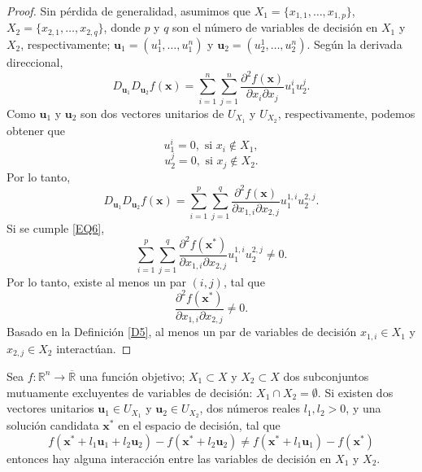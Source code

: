 \begin{proof}
Sin pérdida de generalidad, asumimos que \( X_1 = \{x_{1,1}, \ldots, x_{1,p}\} \), \( X_2 = \{x_{2,1}, \ldots, x_{2,q}\} \), donde \( p \) y \( q \) son el número de variables de decisión en \( X_1 \) y \( X_2 \), respectivamente; \( \mathbf{u}_1 = (u_1^1, \ldots, u_1^n) \) y \( \mathbf{u}_2 = (u_2^1, \ldots, u_2^n) \). Según la derivada direccional,
\begin{equation}
D_{\mathbf{u}_1} D_{\mathbf{u}_2} f(\mathbf{x}) = \sum_{i=1}^{n} \sum_{j=1}^{n} \frac{\partial^2 f(\mathbf{x})}{\partial x_i \partial x_j} u_1^i u_2^j.
\label{EQ17}
\end{equation}
Como \( \mathbf{u}_1 \) y \( \mathbf{u}_2 \) son dos vectores unitarios de \( U_{X_1} \) y \( U_{X_2} \), respectivamente, podemos obtener que
\begin{equation}
u_1^i = 0, \text{ si } x_i \notin X_1,
\label{EQ18}
\end{equation}
\begin{equation}
u_2^j = 0, \text{ si } x_j \notin X_2.
\label{EQ19}
\end{equation}
Por lo tanto,
\begin{equation}
D_{\mathbf{u}_1} D_{\mathbf{u}_2} f(\mathbf{x}) = \sum_{i=1}^{p} \sum_{j=1}^{q} \frac{\partial^2 f(\mathbf{x})}{\partial x_{1,i} \partial x_{2,j}} u_1^{1,i} u_2^{2,j}.
\label{EQ20}
\end{equation}
Si se cumple \eqref{EQ6},
\begin{equation}
\sum_{i=1}^{p} \sum_{j=1}^{q} \frac{\partial^2 f(\mathbf{x}^*)}{\partial x_{1,i} \partial x_{2,j}} u_1^{1,i} u_2^{2,j} \neq 0.
\label{EQ21}
\end{equation}
Por lo tanto, existe al menos un par \((i, j)\), tal que
\begin{equation}
\frac{\partial^2 f(\mathbf{x}^*)}{\partial x_{1,i} \partial x_{2,j}} \neq 0.
\label{EQ22}
\end{equation}
Basado en la Definición \ref{D5}, al menos un par de variables de decisión \( x_{1,i} \in X_1 \) y \( x_{2,j} \in X_2 \) interactúan.
\end{proof}

\begin{corolario}
\label{C1}
Sea \( f : \mathbb{R}^n \to \overline{\mathbb{R}} \) una función objetivo; \( X_1 \subset X \) y \( X_2 \subset X \) dos subconjuntos mutuamente excluyentes de variables de decisión: \( X_1 \cap X_2 = \emptyset \). Si existen dos vectores unitarios \( \mathbf{u}_1 \in U_{X_1} \) y \( \mathbf{u}_2 \in U_{X_2} \), dos números reales \( l_1, l_2 > 0 \), y una solución candidata \( \mathbf{x}^* \) en el espacio de decisión, tal que
\begin{equation}
f(\mathbf{x}^* + l_1 \mathbf{u}_1 + l_2 \mathbf{u}_2) - f(\mathbf{x}^* + l_2 \mathbf{u}_2) \neq f(\mathbf{x}^* + l_1 \mathbf{u}_1) - f(\mathbf{x}^*)
\label{EQ23}
\end{equation}
entonces hay alguna interacción entre las variables de decisión en \( X_1 \) y \( X_2 \).
\end{corolario}

